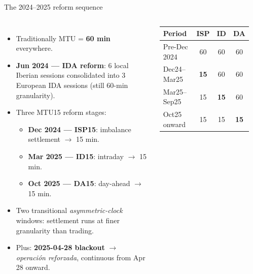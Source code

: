 \documentclass[10pt,aspectratio=169]{beamer}
\begin{document}
\begin{frame}{The 2024--2025 reform sequence}
  \begin{columns}[T,onlytextwidth]
    \footnotesize
    \begin{itemize}
      \item Traditionally MTU = \textbf{60 min} everywhere.
      \item \textbf{Jun 2024 --- IDA reform}: 6 local Iberian sessions consolidated into 3 European IDA sessions (still 60-min granularity).
      \item Three MTU15 reform stages:
        \begin{itemize}
          \item \textbf{Dec 2024 --- ISP15}: imbalance settlement $\to$ 15 min.
          \item \textbf{Mar 2025 --- ID15}: intraday $\to$ 15 min.
          \item \textbf{Oct 2025 --- DA15}: day-ahead $\to$ 15 min.
        \end{itemize}
      \item Two transitional \emph{asymmetric-clock} windows: settlement runs at finer granularity than trading.
      \item Plus: \textbf{2025-04-28 blackout} $\to$ \emph{operación reforzada}, continuous from Apr 28 onward.
    \end{itemize}
    \centering
    \begin{tabular}{lccc}
      \toprule
      Period & ISP & ID & DA \\
      \midrule
      Pre-Dec 2024 & 60 & 60 & 60 \\
      Dec24--Mar25 & \textbf{15} & 60 & 60 \\
      Mar25--Sep25 & 15 & \textbf{15} & 60 \\
      Oct25 onward & 15 & 15 & \textbf{15} \\
      \bottomrule
    \end{tabular}\\[12pt]
  \end{columns}
\end{frame}
\end{document}
